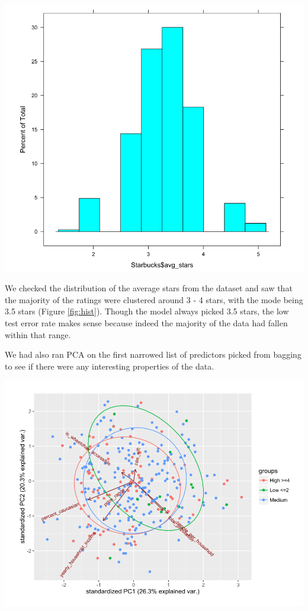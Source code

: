 \documentclass{article}
\newenvironment{Figure}
  {\par\medskip\noindent\minipage{\linewidth}}
  {\endminipage\par\medskip}
\begin{document}
\begin{multicols}{2}
\begin{Figure}
\centering
   \includegraphics[width=\linewidth]{avgstars}
	\label{fig:hist}
\end{Figure}

We checked the distribution of the average stars from the dataset and saw that the majority of the ratings were clustered around 3 - 4 stars, with the mode being 3.5 stars (Figure \ref{fig:hist}). Though the model always picked 3.5 stars, the low test error rate makes sense because indeed the majority of the data had fallen within that range. 

We had also ran PCA on the first narrowed list of predictors picked from bagging to see if there were any interesting properties of the data. 

\begin{Figure}
\centering
   \includegraphics[width=\linewidth]{pc12}
	\label{fig:pc12}
\end{Figure}


\end{multicols}
\end{document}

